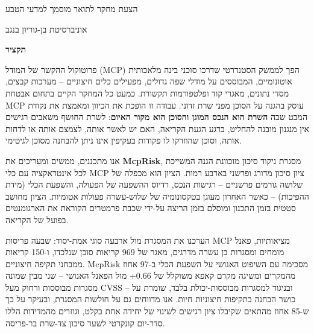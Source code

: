 \thispagestyle{empty}

\begin{center}
    \Large
    \thesistitlehe

    \vspace{0.4cm}
    \large
    \thesisauthornamehe
       
    \vspace{0.4cm}
    \large
    הצעת מחקר לתואר מוסמך למדעי הטבע
      
    \vspace{0.2cm}
    \large
    אוניברסיטת בן-גוריון בנגב
    
    \vspace{0.2cm}
    \large
    
    \thesisyear
    
    \vspace{0.9cm}
    \Large
    \textbf{תקציר}
\end{center}

פרוטוקול ההקשר של המודל (MCP) הפך לממשק הסטנדרטי שדרכו סוכני בינה מלאכותית
אוטונומיים, המבוססים על מודלי שפה גדולים, מפעילים כלים חיצוניים -- מערכות
קבצים, מסדי נתונים, מאגרי קוד ופלטפורמות תקשורת. כמעט כל המחקר הקיים בתחום
אבטחת MCP עוסק בהגנה על הסוכן מפני שרת זדוני. עבודה זו הופכת את הכיוון ומאמצת
את נקודת המבט שבה \textbf{השרת הוא הנכס המוגן והסוכן הוא מקור האיום}: לשרת
החושף משאבים רגישים אין מנגנון מובנה להחליט, ברגע הגעת הקריאה, האם יש לאשר
אותה, לצמצם אותה או לדחות אותה, וסוכן שהוזרקו לו פקודות בעקיפין אינו ניתן
להבחנה מסוכן לגיטימי.

אנו מתכננים, ממשים ומעריכים את \textbf{McpRisk}, מסגרת ניקוד סיכון מוכוונת
הגנה המשייכת לכל אינטראקציה עם כלי MCP ציון סיכון מדורג ופרשני בארבע רמות.
הציון הוא מכפלה של שלושה גורמים פרשניים -- רגישות הנכס, רדיוס ההשפעה של הפעולה,
והשפעת הכלי (מידת ההפיכות) -- כאשר האחרון מעוגן בטקסונומיה של שלוש-עשרה פעולות
אטומיות. הציון מחושב סטטית בזמן התכנון ומוסלם בזמן הריצה על-ידי שכבת פרמטרים
הקוראת את הארגומנטים בפועל של הקריאה.

הערכנו את המסגרת מול ארבעה סוגי אמת-יסוד: שבעה פריסות MCP מציאותיות, פאנל
מומחים ומסגרות בן עשרה מדרגים, מאגר של 969 קריאות סוכן שנלכדו, ו-150 קריאות
ממבחני תקיפה חיצוניים. McpRisk מסכימה עם השיפוט האנושי על השפעת הכלי ב-97 אחוז
מהמקרים ומשיגה מקדם קאפא משוקלל של 0.66+ מול הפאנל האנושי -- שני מבין שמונה
מסגרות מבוססות ורחוק מעל CVSS -- ובניגוד למסגרות מבוססות-יכולת בלבד, שומרת על
כושר הבחנה בתקיפות חיצוניות חיות. אנו מדווחים גם על חולשות המסגרת, ובעיקר על
כך ש-85 אחוז מהתאים שקיבלו ציון רגישים לשינוי של יחידה אחת בקלט, וגוזרים
מהמדידות הללו סדר-יום קונקרטי לשער סיכון צד-שרת בר-פריסה.

